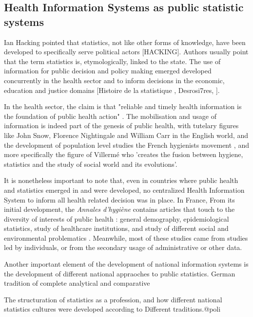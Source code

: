\documentclass[letterpaper, 10 pt, conference]{ieeeconf}  %
\begin{document}
\subsection{Health Information Systems as public statistic systems}

Ian Hacking pointed that statistics, not like other forms of knowledge, have been developed to specifically serve political actors [HACKING]. Authors usually point that the term statistics is, etymologically, linked to the state. The use of information for public decision and policy making emerged developed concurrently in the health sector and to inform decisions in the economic, education and justice domains [Histoire de la statistique , Desrosi7res, \cite{porter_trust_1996}].

In the health sector, the claim is that "reliable and timely health information is the foundation of public health action" \cite{health_metrics_network_framework_2008}\cite{abou-zahr_health_2005}. The mobilisation and usage of information is indeed part of the genesis of public health, with tutelary figures like John Snow, Florence Nightingale and William Carr in the English world, and the development of population level studies the French hygienists movement	\cite{porter_trust_1996}, and more specifically the figure of Villermé who 'creates the fusion between hygiene, statistics and the study of social world and its evolutions'.

It is nonetheless important to note that, even in countries where public health and statistics emerged in and were developed, no centralized Health Information System to inform all health related decision was in place. In France, From its initial development, the \textit{Annales d'hygiène} contains articles that touch to the diversity of interests of public health : general demography, epidemiological statistics, study of healthcare institutions, and study of different social and environmental problematics \cite{lecuyer_medecins_1977}. Meanwhile, most of these studies came from studies led by individuals, or from the secondary usage of administrative or other data.

Another important element of the development of national information systems is the development of different national appraoches to public statistics. German tradition of complete analytical and comparative

The structuration of statistics as a profession, and how different national statistics cultures were developed according to  Different traditions.@poli
\end{document}

